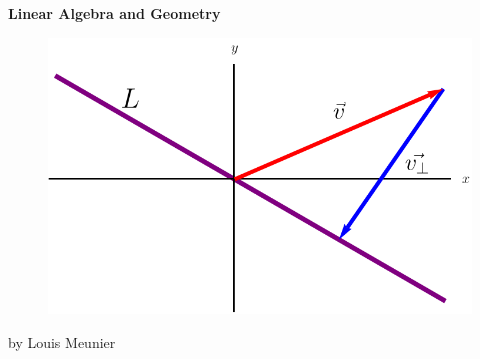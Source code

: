 \documentclass[12pt]{article}
\begin{document}
\newcommand{\red}[1]{\textcolor{red}{#1}}
\newcommand{\real}{\mathbb{R}}
\newcommand{\naturals}{\mathbb{N}}
\newcommand{\integers}{\mathbb{Z}}
\newcommand{\rational}{\mathbb{Q}}
\newcommand{\complex}{\mathbb{C}}

\titleformat{\section}{\newpage\centering\normalfont\Large\bfseries}{}{0pt}{}

\newcommand{\twodmatrix}[2]{\begin{bmatrix}
#1\\
#2\\
\end{bmatrix}}
\newcommand{\twobytwomatrix}[4]{\begin{bmatrix}
#1 &#2\\
#3 &#4\\
\end{bmatrix}}

\hypersetup{
    linkcolor=violet
}

\begin{titlepage}
    \begin{center}
        \vspace*{1cm}
        \Huge
        \textbf{Linear Algebra and Geometry}
        
        \vfill
        
        \begin{figure}[!ht]
            \centering
            \includegraphics{misc/titlepage.png}
        \end{figure}
        \vfill
        
        \small
        by Louis Meunier
        
        \href{https://notes.louismeunier.net}{\color{violet}{notes.louismeunier.net}}
        
    \end{center}
\end{titlepage}
\end{document}
